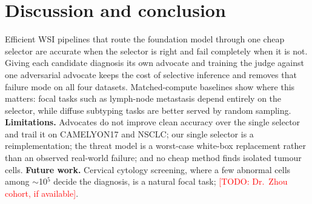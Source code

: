 \documentclass[10pt,twocolumn]{article}
\newcommand{\todo}[1]{\textcolor{red}{[TODO: #1]}}
\begin{document}
\section{Discussion and conclusion}
Efficient WSI pipelines that route the foundation model through one cheap selector are accurate when the selector is right and fail completely when it is not. Giving each candidate diagnosis its own advocate and training the judge against one adversarial advocate keeps the cost of selective inference and removes that failure mode on all four datasets. Matched-compute baselines show where this matters: focal tasks such as lymph-node metastasis depend entirely on the selector, while diffuse subtyping tasks are better served by random sampling. \textbf{Limitations.} Advocates do not improve clean accuracy over the single selector and trail it on CAMELYON17 and NSCLC; our single selector is a reimplementation; the threat model is a worst-case white-box replacement rather than an observed real-world failure; and no cheap method finds isolated tumour cells. \textbf{Future work.} Cervical cytology screening, where a few abnormal cells among $\sim$10$^5$ decide the diagnosis, is a natural focal task; \todo{Dr.\ Zhou cohort, if available}.

{\small

}
\end{document}
